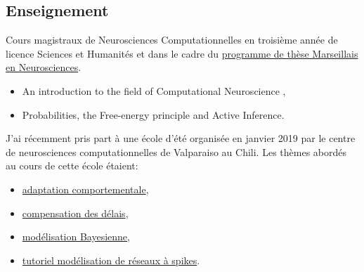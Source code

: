 \documentclass[10pt,french,a4paper,oneside]{article}%
\newcommand{\years}[1]{\marginpar{\textit{\scriptsize #1}}}
\begin{document}
\subsection{Enseignement} %

Cours magistraux de Neurosciences Computationnelles en  troisième année de licence Sciences et Humanités\years{2019} et dans le cadre du  \href{https://laurentperrinet.github.io/post/2018-03-26-cours-neuro-comp-fep/}{programme de thèse Marseillais en Neurosciences}\years{2018}.

\begin{itemize}
	\item An introduction to the field of Computational Neuroscience ,
	\item Probabilities, the Free-energy principle and Active Inference.
\end{itemize}


J'ai récemment pris part à une école d'été organisée en janvier 2019 par le centre de neurosciences computationnelles de Valparaiso au Chili. Les thèmes abordés au cours de cette école étaient:
\begin{itemize}
	\item \href{https://laurentperrinet.github.io/talk/2019-01-18-laconeu/}{adaptation comportementale},
	\item \href{https://laurentperrinet.github.io/talk/2019-01-17-laconeu/}{compensation des délais},
	\item \href{https://laurentperrinet.github.io/talk/2019-01-16-laconeu/}{modélisation Bayesienne},
	\item \href{https://laurentperrinet.github.io/talk/2019-01-14-laconeu/}{tutoriel modélisation de réseaux à spikes}.

\end{itemize}


%
%
%
%
\end{document}

